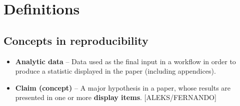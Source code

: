 \documentclass[]{book}
\providecommand{\tightlist}{%
  \setlength{\itemsep}{0pt}\setlength{\parskip}{0pt}}
\begin{document}
\hypertarget{definitions}{%
\chapter{Definitions}\label{definitions}}

\hypertarget{concepts-in-reproducibility}{%
\section{Concepts in reproducibility}\label{concepts-in-reproducibility}}

\begin{itemize}
\tightlist
\item
  \textbf{Analytic data} -- Data used as the final input in a workflow in order to produce a statistic displayed in the paper (including appendices).\\
\item
  \textbf{Claim (concept)} -- A major hypothesis in a paper, whose results are presented in one or more \textbf{display items}. {[}ALEKS/FERNANDO{]}


\end{itemize}
\end{document}
